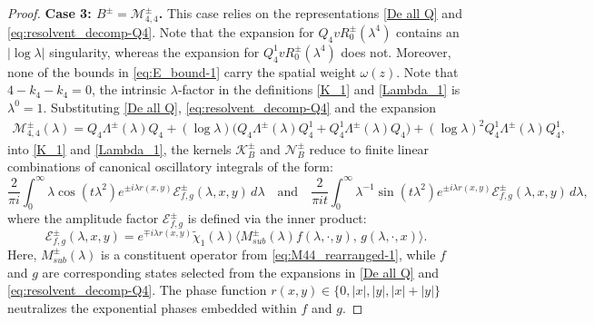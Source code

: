 \documentclass[reqno]{amsart}
\numberwithin{equation}{section}
\begin{document}
\begin{proof}
	
	\textbf{Case 3: $B^\pm=\mathcal{M}_{4,4}^\pm$.}
	This case  relies on the representations \eqref{De all Q} and \eqref{eq:resolvent_decomp-Q4}.
	Note that the expansion for $Q_4v R_0^\pm(\lambda^4)$ contains an $|\log\lambda|$ singularity, whereas the expansion for $Q_{4}^1v R_0^\pm(\lambda^4)$ does not. Moreover, none of the bounds in \eqref{eq:E_bound-1} carry the spatial weight $\omega(z)$.
	Note that  $4-k_4-k_4=0$, the intrinsic $\lambda$-factor in the definitions \eqref{K_1} and \eqref{Lambda_1} is $\lambda^0 = 1$.
Substituting  \eqref{De all Q}, \eqref{eq:resolvent_decomp-Q4} and  the  expansion 
		\begin{align}\label{eq:M44_rearranged-1}
		\mathcal{M}_{4,4}^{\pm}(\lambda) = Q_{4} \Lambda^\pm(\lambda) Q_{4} + (\log\lambda)\bigl(Q_{4} \Lambda^\pm(\lambda) Q_{4}^1+Q_{4}^1 \Lambda^\pm(\lambda) Q_{4}\bigr) + (\log\lambda)^2 Q_{4}^1 \Lambda^\pm(\lambda)Q_{4}^1,
	\end{align}
	 into \eqref{K_1} and \eqref{Lambda_1}, the kernels $\mathcal{K}_B^\pm$ and $\mathcal{N}_B^\pm$ reduce to finite linear combinations of canonical oscillatory integrals of the form:
	\begin{equation}\label{eq:canonical_oscillatory_prop1}
		\frac{2}{\pi i}	\int_0^\infty \lambda \cos(t\lambda^2) e^{\pm i\lambda r(x,y)} \mathcal{E}_{f,g}^\pm(\lambda, x, y) \, d\lambda \quad \text{and} \quad
		\frac{2}{\pi it} \int_0^\infty \lambda^{-1} \sin(t\lambda^2) e^{\pm i\lambda r(x,y)} \mathcal{E}_{f,g}^\pm(\lambda, x, y) \, d\lambda,
	\end{equation}
	where the amplitude factor $\mathcal{E}_{f,g}^\pm$ is defined via the inner product:
	\begin{equation}\label{eq:amplitude_def_prop1}
		\mathcal{E}_{f,g}^\pm(\lambda, x, y) = e^{\mp i\lambda r(x,y)} \widetilde{\chi}_1(\lambda) \big\langle M_{sub}^\pm(\lambda) f(\lambda, \cdot, y), \, g(\lambda, \cdot, x) \big\rangle.
	\end{equation}
	Here, $M_{sub}^\pm(\lambda)$ is a constituent operator from \eqref{eq:M44_rearranged-1}, while $f$ and $g$ are corresponding states selected from the expansions in \eqref{De all Q} and \eqref{eq:resolvent_decomp-Q4}. The phase function $r(x,y) \in \{0, |x|, |y|, |x|+|y|\}$ neutralizes the exponential phases embedded within $f$ and $g$.


\end{proof}
\end{document}
